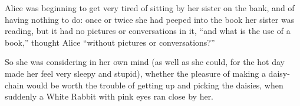 \documentclass[10pt]{article}
\begin{document}
 Alice was beginning to get very tired of sitting by her sister on the bank, and of having nothing to do: once or twice she had peeped into the book her sister was reading, but it had no pictures or conversations in it, “and what is the use of a book,” thought Alice “without pictures or conversations?”

    
    So she was considering in her own mind (as well as she could, for the hot day made her feel very sleepy and stupid), whether the pleasure of making a daisy-chain would be worth the trouble of getting up and picking the daisies, when suddenly a White Rabbit with pink eyes ran close by her. 
\end{document}
